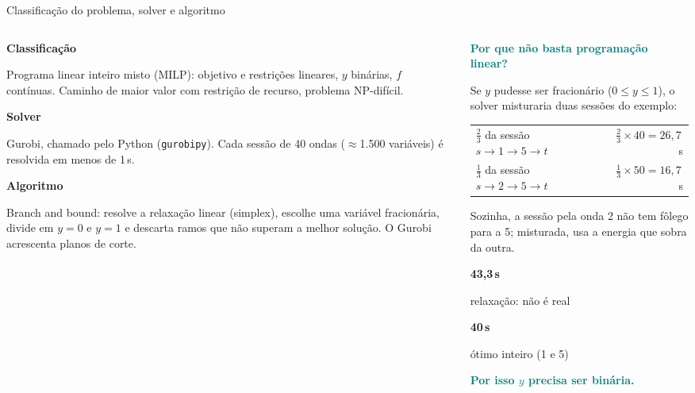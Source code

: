 \documentclass[aspectratio=169,10pt,xcolor=table]{beamer}
\newcommand{\cartao}[3][nevoa]{%
  \begin{tcolorbox}[colback=#1, colframe=#1]
  {\color{teal}\bfseries #2}\par\smallskip #3
  \end{tcolorbox}}
\newcommand{\grande}[2][laranja]{{\color{#1}\fontsize{24}{26}\selectfont\bfseries #2}}
\begin{document}
\begin{frame}{Classificação do problema, solver e algoritmo}
\begin{columns}[T]
\begin{column}{0.55\textwidth}
\footnotesize
\cartao{Classificação}{Programa linear inteiro misto (MILP): objetivo e restrições lineares, $y$ binárias, $f$ contínuas. Caminho de maior valor com restrição de recurso, problema NP-difícil.}
\cartao{Solver}{Gurobi, chamado pelo Python (\texttt{gurobipy}). Cada sessão de 40 ondas ($\approx$1.500 variáveis) é resolvida em menos de 1\,s.}
\cartao{Algoritmo}{Branch and bound: resolve a relaxação linear (simplex), escolhe uma variável fracionária, divide em $y=0$ e $y=1$ e descarta ramos que não superam a melhor solução. O Gurobi acrescenta planos de corte.}
\end{column}
\begin{column}{0.42\textwidth}
\textcolor{teal}{\small\bfseries Por que não basta programação linear?}\par\smallskip
{\footnotesize Se $y$ pudesse ser fracionário ($0 \le y \le 1$), o solver misturaria duas sessões do exemplo:\par\smallskip
{\renewcommand{\arraystretch}{1.3}\begin{tabular}{@{}l r@{}}
$\tfrac23$ da sessão $s \to 1 \to 5 \to t$ & $\tfrac23 \times 40 = 26{,}7$\,s \\
$\tfrac13$ da sessão $s \to 2 \to 5 \to t$ & $\tfrac13 \times 50 = 16{,}7$\,s \\
\end{tabular}}\par\smallskip
Sozinha, a sessão pela onda 2 não tem fôlego para a 5; misturada, usa a energia que sobra da outra.\par}
\smallskip
\begin{tcbraster}[raster columns=2, raster equal height, raster column skip=2mm]
\begin{tcolorbox}[colback=areia, colframe=areia, halign=center]
\grande{43,3\,s}\par{\scriptsize relaxação: não é real}
\end{tcolorbox}
\begin{tcolorbox}[colback=nevoa, colframe=nevoa, halign=center]
\grande[marmedio]{40\,s}\par{\scriptsize ótimo inteiro (1 e 5)}
\end{tcolorbox}
\end{tcbraster}
\textcolor{teal}{\footnotesize\bfseries Por isso $y$ precisa ser binária.}\par

\end{column}
\end{columns}
\end{frame}
\end{document}
